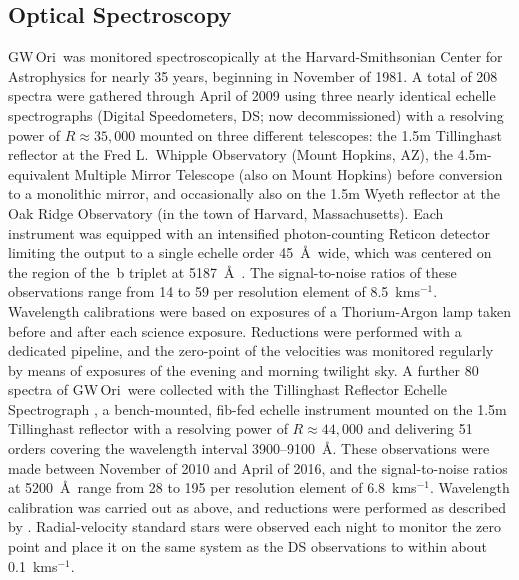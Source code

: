 \documentclass[twocolumn]{aastex6}
\newcommand\kms{\ifmmode{\rm km\thinspace s^{-1}}\else km\thinspace s$^{-1}$\fi}
\newcommand{\gw}{GW\,Ori}
\begin{document}
\subsection{Optical Spectroscopy \label{sec:spectroscopy}}

\gw\ was monitored spectroscopically at the Harvard-Smithsonian Center
for Astrophysics for nearly 35 years, beginning in November of 1981. A
total of 208 spectra were gathered through April of 2009 using three
nearly identical echelle spectrographs (Digital Speedometers, DS; now
decommissioned) with a resolving power of $R \approx 35,000$ mounted
on three different telescopes: the 1.5m Tillinghast reflector at the
Fred L.\ Whipple Observatory (Mount Hopkins, AZ), the 4.5m-equivalent
Multiple Mirror Telescope (also on Mount Hopkins) before conversion to
a monolithic mirror, and occasionally also on the 1.5m Wyeth reflector
at the Oak Ridge Observatory (in the town of Harvard,
Massachusetts). Each instrument was equipped with an intensified
photon-counting Reticon detector limiting the output to a single
echelle order 45~\AA\ wide, which was centered on the region of the
\,b triplet at 5187~\AA\ \citep[see][]{Latham1992}. The
signal-to-noise ratios of these observations range from 14 to 59 per
resolution element of 8.5~\kms. Wavelength calibrations were based on
exposures of a Thorium-Argon lamp taken before and after each science
exposure. Reductions were performed with a dedicated pipeline, and the
zero-point of the velocities was monitored regularly by means of
exposures of the evening and morning twilight sky. A further 80
spectra of \gw\ were collected with the Tillinghast Reflector Echelle
Spectrograph \citep[TRES;][]{Furesz2008}, a bench-mounted, fib-fed
echelle instrument mounted on the 1.5m Tillinghast reflector with a
resolving power of $R \approx 44,000$ and delivering 51 orders
covering the wavelength interval 3900--9100~\AA. These observations
were made between November of 2010 and April of 2016, and the
signal-to-noise ratios at 5200~\AA\ range from 28 to 195 per
resolution element of 6.8~\kms. Wavelength calibration was carried out
as above, and reductions were performed as described by
\cite{Buchhave:..}. Radial-velocity standard stars were observed each
night to monitor the zero point and place it on the same system as the
DS observations to within about 0.1~\kms.
\end{document}
